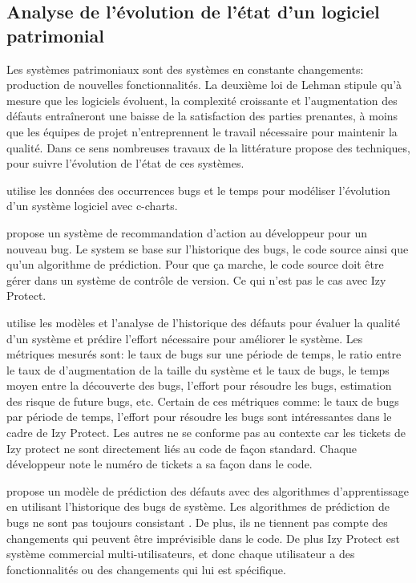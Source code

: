 \documentclass[a4paper]{article}
\begin{document}
\subsection{Analyse de l'évolution de l'état d'un logiciel patrimonial}
\label{sec:etatLogiciel}

Les systèmes  patrimoniaux sont des systèmes en constante changements: production de nouvelles fonctionnalités.
 La deuxième loi de Lehman \cite{Lehm96a} stipule qu'à mesure que les logiciels évoluent, la complexité croissante et l'augmentation des défauts entraîneront une baisse de la satisfaction des parties prenantes, à moins que les équipes de projet n'entreprennent le travail nécessaire pour maintenir la qualité.
 Dans ce sens nombreuses travaux de la littérature propose des techniques, pour suivre l'évolution de l'état de  ces systèmes.
 
\citep{Zhan10a} utilise les données des occurrences bugs et le temps pour modéliser l'évolution d'un système logiciel avec  c-charts.

\citep{lenar17} propose un système de recommandation  d'action au développeur pour un nouveau bug. Le system se  base sur l'historique des bugs, le code source ainsi que qu'un algorithme de prédiction.  Pour que ça marche, le code source doit être gérer dans un système de contrôle de version. Ce qui n'est pas le cas avec Izy Protect.
 
\citep{port17} utilise les modèles  et l'analyse de l'historique des défauts pour évaluer la qualité d'un système et prédire l'effort nécessaire pour améliorer le système. Les métriques mesurés sont: le taux de bugs sur une période de temps, le ratio entre le taux de d'augmentation de la taille du système et le taux de bugs, le temps moyen entre la découverte des bugs, l'effort pour résoudre les bugs, estimation des risque de future bugs, etc.
 Certain de ces métriques comme: le taux de bugs par période de temps, l'effort pour résoudre les bugs  sont intéressantes dans le cadre de Izy Protect. 
Les autres ne se conforme pas au contexte car les tickets de Izy protect ne sont directement liés au code de façon standard.
Chaque développeur note le numéro de tickets a sa façon dans le code. 
 

\cite{kim07,Bibi06} propose  un modèle de prédiction des défauts avec des algorithmes d'apprentissage en utilisant l'historique des bugs de système. 
Les algorithmes de prédiction de bugs ne sont pas toujours consistant \cite{bang19}. De plus, ils ne tiennent pas compte des changements qui peuvent être imprévisible dans le code. De plus Izy Protect est système commercial multi-utilisateurs, et donc chaque utilisateur a des fonctionnalités ou des changements qui lui est spécifique. 
\end{document}
